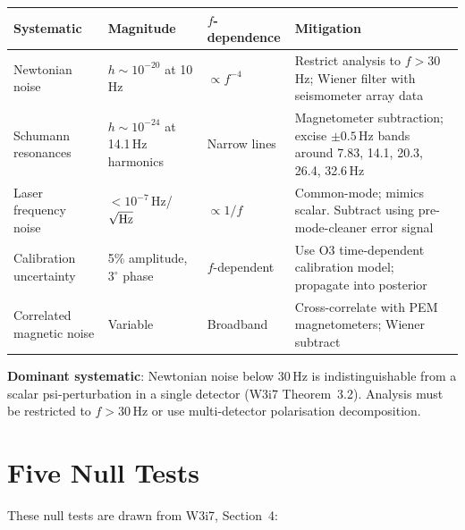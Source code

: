 \documentclass[11pt]{article}
\begin{document}
\begin{center}
\renewcommand{\arraystretch}{1.25}
\begin{tabular}{@{}p{4cm}p{3cm}p{2.5cm}p{4cm}@{}}
\toprule
\textbf{Systematic} & \textbf{Magnitude} & \textbf{$f$-dependence} &
  \textbf{Mitigation} \\
\midrule
Newtonian noise & $h \sim 10^{-20}$ at 10\,Hz & $\propto f^{-4}$ &
  Restrict analysis to $f > 30$\,Hz; Wiener filter with seismometer
  array data \\
\midrule
Schumann resonances & $h \sim 10^{-24}$ at 14.1\,Hz harmonics &
  Narrow lines & Magnetometer subtraction; excise $\pm 0.5$\,Hz bands
  around 7.83, 14.1, 20.3, 26.4, 32.6\,Hz \\
\midrule
Laser frequency noise & $< 10^{-7}$\,Hz/$\sqrt{\rm Hz}$ &
  $\propto 1/f$ & Common-mode; mimics scalar. Subtract using
  pre-mode-cleaner error signal \\
\midrule
Calibration uncertainty & 5\% amplitude, $3^\circ$ phase &
  $f$-dependent & Use O3 time-dependent calibration model;
  propagate into posterior \\
\midrule
Correlated magnetic noise & Variable & Broadband &
  Cross-correlate with PEM magnetometers; Wiener subtract \\
\bottomrule
\end{tabular}
\end{center}

\textbf{Dominant systematic}: Newtonian noise below 30\,Hz is
indistinguishable from a scalar psi-perturbation in a single
detector (W3i7 Theorem~3.2). Analysis must be restricted to
$f > 30$\,Hz or use multi-detector polarisation decomposition.

\section{Five Null Tests}
\label{sec:ligo_null}

These null tests are drawn from W3i7, Section~4:
\end{document}
